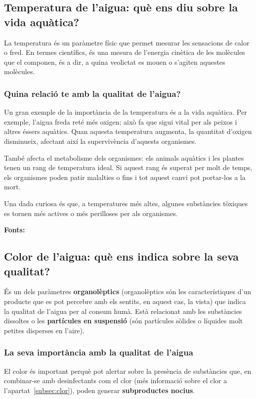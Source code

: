 \subsection{Temperatura de l’aigua: què ens diu sobre la vida aquàtica?} \label{subsec:temperatura}
La temperatura és un paràmetre físic que permet mesurar les sensacions de calor o fred. En termes científics, és una mesura de l’energia cinètica de les molècules que el componen, és a dir, a quina veolictat es mouen o s’agiten aquestes molècules.
\subsubsection{Quina relació te amb la qualitat de l'aigua?}
Un gran exemple de la importància de la temperatura és a la vida aquàtica. Per exemple, l’aigua freda reté més oxigen; això fa que sigui vital per als peixos i altres éssers aquàtics. Quan aquesta temperatura augmenta, la quantitat d’oxigen disminueix, afectant així la supervivència d’aquests organismes.

També afecta el metabolisme dels organismes: els animals aquàtics i les plantes tenen un rang de temperatura ideal. Si aquest rang és superat per molt de temps, els organismes poden patir malalties o fins i tot aquest canvi pot portar-los a la mort.

Una dada curiosa és que, a temperatures més altes, algunes substàncies tòxiques es tornen més actives o més perilloses per als organismes.

\textbf{Fonts:} \cite{UCM}

\subsection{Color de l’aigua: què ens indica sobre la seva qualitat?} \label{subsec:color}
És un dels paràmetres \textbf{organolèptics} (organolèptics són les característiques d'un producte que es pot percebre amb els sentits, en aquest cas, la vista) que indica la qualitat de l'aigua per al consum humà. Està relacionat amb les substàncies dissoltes o les \textbf{partícules en suspensió} (són partícules sòlides o líquides molt petites disperses en l’aire).
\subsubsection{La seva importància amb la qualitat de l'aigua}
El color és important perquè pot alertar sobre la presència de substàncies que, en combinar-se amb desinfectants com el clor (més informació sobre el clor a l'apartat~\ref{subsec:clor}), poden generar \textbf{subproductes nocius}.

